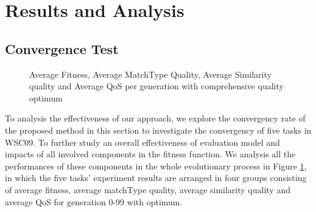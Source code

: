 \documentclass{llncs}
\begin{document}
\section{Results and Analysis}\label{results_analysis}
\subsection{Convergence Test}\label{convergenceTest}

\begin{figure}[h]
\centerline{
}
 \caption{Average Fitness, Average MatchType Quality, Average Similarity quality and Average QoS per generation with comprehensive quality optimum}
 \label{exp_fitnessvalue}
\end{figure}

To analysis the effectiveness of our approach, we explore the convergency rate of the proposed method in this section to investigate the convergency of five tasks in WSC09. To further study an overall effectiveness of evaluation model and impacts of all involved components in the fitness function. We analysis all the performances of these components in the whole evolutionary process in Figure \ref{exp_fitnessvalue}, in which the five tasks' experiment results are arranged in four groups consisting of average fitness, average matchType quality, average similarity quality and average QoS for generation 0-99 with optimum.
\end{document}
